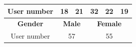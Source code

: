 \begin{table}[]
\begin{tabular}{|l|c|c|c|c|c|l|}
\multicolumn{1}{|c|}{User number}     & \multicolumn{1}{l|}{18} & \multicolumn{1}{l|}{21}               & \multicolumn{1}{l|}{32}                & \multicolumn{1}{l|}{22}                & \multicolumn{2}{l|}{19}                         \\ \hline
\multicolumn{1}{|c|}{\textbf{Gender}} & \multicolumn{2}{c|}{\textbf{Male}}                              & \multicolumn{4}{c|}{\textbf{Female}}                                                                                              \\ \hline
\multicolumn{1}{|c|}{User number}     & \multicolumn{2}{c|}{57}                                         & \multicolumn{4}{c|}{55}                                                                                                           \\ \hline
\end{tabular}
\end{table}

%
%















